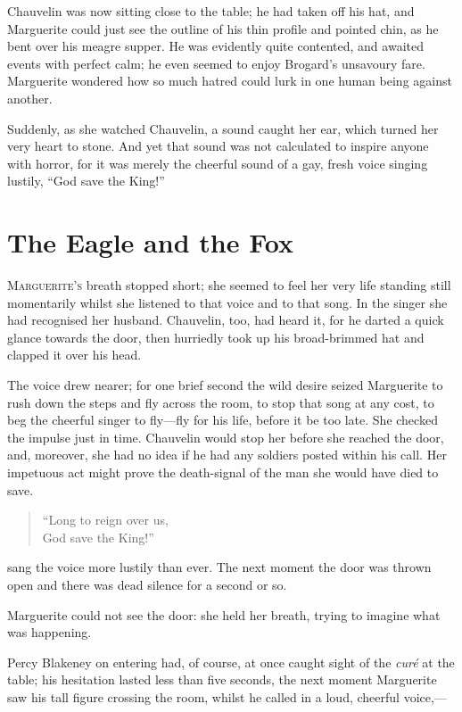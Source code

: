 \documentclass[paper=5.5in:8.5in,BCOR=7mm,twoside,DIV=calc,12pt,usegeometry,chapterprefix,endperiod,headings=big]{scrbook}
\begin{document}
Chauvelin was now sitting close to the table; he had taken off his hat, and Marguerite could just see the outline of his thin profile and pointed chin, as he bent over his meagre supper. He was evidently quite contented, and awaited events with perfect calm; he even seemed to enjoy Brogard's unsavoury fare. Marguerite wondered how so much hatred could lurk in one human being against another.

Suddenly, as she watched Chauvelin, a sound caught her ear, which turned her very heart to stone. And yet that sound was not calculated to inspire anyone with horror, for it was merely the cheerful sound of a gay, fresh voice singing lustily, \enquote{God save the King!}

\chapter{The Eagle and the Fox}
\lettrine[lines=4]{M}{arguerite's} breath stopped short; she seemed to feel her very life standing still momentarily whilst she listened to that voice and to that song. In the singer she had recognised her husband. Chauvelin, too, had heard it, for he darted a quick glance towards the door, then hurriedly took up his broad-brimmed hat and clapped it over his head.

The voice drew nearer; for one brief second the wild desire seized Marguerite to rush down the steps and fly across the room, to stop that song at any cost, to beg the cheerful singer to fly---fly for his life, before it be too late. She checked the impulse just in time. Chauvelin would stop her before she reached the door, and, moreover, she had no idea if he had any soldiers posted within his call. Her impetuous act might prove the death-signal of the man she would have died to save.

\blockquote{
\enquote{Long to reign over us,\\
God save the King!}
}

sang the voice more lustily than ever. The next moment the door was thrown open and there was dead silence for a second or so.

Marguerite could not see the door: she held her breath, trying to imagine what was happening.

Percy Blakeney on entering had, of course, at once caught sight of the \textit{curé} at the table; his hesitation lasted less than five seconds, the next moment Marguerite saw his tall figure crossing the room, whilst he called in a loud, cheerful voice,---
\end{document}
